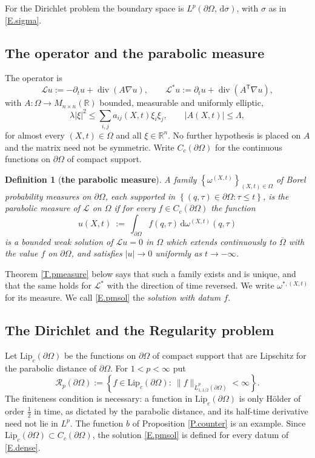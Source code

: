 \documentclass[12pt,leqno]{amsart}
\numberwithin{equation}{section}
\DeclareMathOperator{\divg}{div}
\newcommand{\R}{\mathbb R}
\newcommand{\abs}[1]{\left\vert#1\right\vert}
\newcommand{\br}[1]{\left(#1\right)}
\newcommand{\set}[1]{\left\{#1\right\}}
\newcommand{\om}{\Omega}
\newcommand{\pom}{\partial\Omega}
\newcommand{\pd}{\partial}
\newcommand{\LL}{\mathcal L}
\renewcommand{\d}{\,\mathrm d}
\newcommand{\Lipc}{\mathrm{Lip}_c}
\theoremstyle{plain}
\newtheorem{definition}[equation]{Definition}
\theoremstyle{remark}
\begin{document}
\noindent For the Dirichlet problem the boundary space is
$L^p(\pom,\d\sigma)$, with $\sigma$ as in \eqref{E.sigma}.\medskip

\subsection{The operator and the parabolic measure}\label{ss.pm}

The operator is
\begin{equation}\label{E.pde}
  \LL u:=-\pd_tu+\divg\br{A\nabla u},\qquad
  \LL^*u:=\pd_tu+\divg\br{A^{\mathsf T}\nabla u},
\end{equation}
with $A:\om\to M_{n\times n}(\R)$ bounded, measurable and uniformly elliptic,
\begin{equation}\label{E.elliptic}
  \lambda\abs\xi^2\le\sum_{i,j}a_{ij}(X,t)\xi_i\xi_j,\qquad
  \abs{A(X,t)}\le\Lambda ,
\end{equation}
for almost every $(X,t)\in\om$ and all $\xi\in\R^n$. No further hypothesis is
placed on $A$ and the matrix need not be symmetric. Write $C_c(\pom)$ for the
continuous functions on $\pom$ of compact support.

\begin{definition}[\bf the parabolic measure]\label{D.pm}
A family $\set{\omega^{(X,t)}}_{(X,t)\in\om}$ of Borel probability measures on
$\pom$, each supported in $\set{(q,\tau)\in\pom:\tau\le t}$, is the \emph{parabolic
measure} of $\LL$ on $\om$ if for every $f\in C_c(\pom)$ the function
\begin{equation}\label{E.pmsol}
  u(X,t)\ :=\ \int_{\pom}f(q,\tau)\d\omega^{(X,t)}(q,\tau)
\end{equation}
is a bounded weak solution of $\LL u=0$ in $\om$ which extends continuously to
$\overline\om$ with the value $f$ on $\pom$, and satisfies $\abs u\to0$
uniformly as $t\to-\infty$.
\end{definition}

\noindent Theorem \ref{T.pmeasure} below says that such a family exists and is
unique, and that the same holds for $\LL^*$ with the direction of time
reversed. We write $\omega^{*,(X,t)}$ for its measure. We call \eqref{E.pmsol}
the \emph{solution with datum $f$}.

\subsection{The Dirichlet and the Regularity problem}\label{ss.bvp}

Let $\Lipc(\pom)$ be the functions on $\pom$ of compact support that are
Lipschitz for the parabolic distance of $\pom$. For $1<p<\infty$ put
\begin{equation}\label{E.dense}
  \mathcal R_p(\pom):=\set{f\in\Lipc(\pom):\
   \|f\|_{\dot L^p_{1,1/2}(\pom)}<\infty} .
\end{equation}
The finiteness condition is necessary: a function in $\Lipc(\pom)$ is only
H\"older of order $\tfrac12$ in time, as dictated by the parabolic distance,
and its half-time derivative need not lie in $L^p$. The function $b$ of
Proposition \ref{P.counter} is an example.
Since $\Lipc(\pom)\subset C_c(\pom)$, the solution \eqref{E.pmsol} is defined
for every datum of \eqref{E.dense}.
\end{document}
